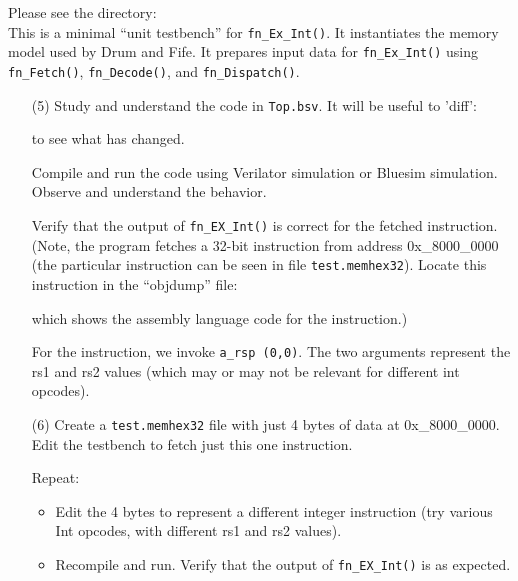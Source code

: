 Please see the directory:  \\
This is a minimal ``unit testbench'' for \verb|fn_Ex_Int()|.  It
instantiates the memory model used by Drum and Fife.  It prepares
input data for \verb|fn_Ex_Int()| using \verb|fn_Fetch()|,
\verb|fn_Decode()|, and \verb|fn_Dispatch()|.

\begin{itemize}

\item[(5)] Study and understand the code in \verb|Top.bsv|. It will be
    useful to 'diff':
    to see what has changed.

    Compile and run the code using Verilator simulation or Bluesim
    simulation.  Observe and understand the behavior.

    Verify that the output of \verb|fn_EX_Int()| is correct for the
    fetched instruction. (Note, the program fetches a 32-bit
    instruction from address 0x\_8000\_0000 (the particular
    instruction can be seen in file \verb|test.memhex32|).  Locate
    this instruction in the ``objdump'' file:


    which shows the assembly language code for the instruction.)

    For the instruction, we invoke \verb|a_rsp (0,0)|.  The two
    arguments represent the rs1 and rs2 values (which may or may not
    be relevant for different int opcodes).

\item[(6)] Create a \verb|test.memhex32| file with just 4 bytes of
    data at 0x\_8000\_0000.  Edit the testbench to fetch just this one
    instruction.

    Repeat:
    \begin{itemize}

    \item Edit the 4 bytes to represent a different integer instruction
        (try various Int opcodes, with different rs1 and rs2 values).

    \item Recompile and run. Verify that the output of
          \verb|fn_EX_Int()| is as expected.

    \end{itemize}

\end{itemize}

